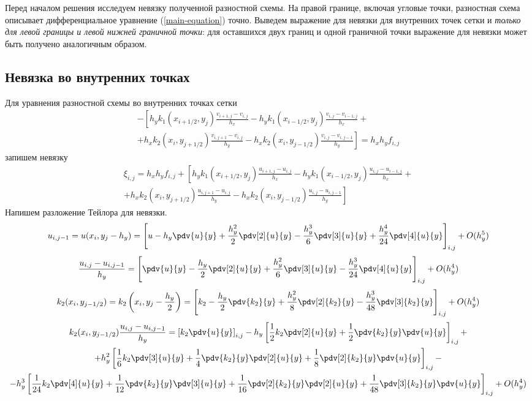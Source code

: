 Перед началом решения исследуем невязку полученной разностной схемы.
На правой границе, включая угловые точки, разностная схема описывает
дифференциальное уравнение (\ref{main-equation}) точно. Выведем выражение
для невязки для внутренних точек сетки и \textit{только для левой границы и левой
нижней граничной точки}: для оставшихся двух границ и одной граничной точки
выражение для невязки может быть получено аналогичным образом.

\subsection{Невязка во внутренних точках}
Для уравнения разностной схемы во внутренних точках сетки
\begin{multline*}
    - \left[
    h_y k_1(x_{i+1/2},y_{j}) \frac{v_{i+1,j} - v_{i,j}}{h_x} - h_y k_1(x_{i-1/2},y_{j}) \frac{v_{i,j} - v_{i-1,j}}{h_x} + \right. \\
    \left. +
    h_x k_2(x_{i},y_{j+1/2}) \frac{v_{i,j+1} - v_{i,j}}{h_y} - h_x k_2(x_{i},y_{j-1/2}) \frac{v_{i,j} - v_{i,j-1}}{h_y}
    \right] =
    h_x h_y f_{i,j}
\end{multline*}
запишем невязку
\begin{multline*}
    \xi_{i,j} = h_x h_y f_{i,j} + \left[
    h_y k_1(x_{i+1/2},y_{j}) \frac{u_{i+1,j} - u_{i,j}}{h_x} - h_y k_1(x_{i-1/2},y_{j}) \frac{u_{i,j} - u_{i-1,j}}{h_x} + \right. \\
    \left. +
    h_x k_2(x_{i},y_{j+1/2}) \frac{u_{i,j+1} - u_{i,j}}{h_y} - h_x k_2(x_{i},y_{j-1/2}) \frac{u_{i,j} - u_{i,j-1}}{h_y}
    \right]
\end{multline*}
Напишем разложение Тейлора для невязки.
\[
    u_{i,j-1} = u(x_{i}, y_{j} - h_y) = \left[ u - h_y \pdv{u}{y} + \frac{h_y^2}{2} \pdv[2]{u}{y} -
    \frac{h_y^3}{6} \pdv[3]{u}{y} + \frac{h_y^4}{24} \pdv[4]{u}{y} \right]_{i,j} + O(h_y^5)
\]
\[
    \frac{u_{i,j} - u_{i,j-1}}{h_y} = \left[ \pdv{u}{y} - \frac{h_y}{2} \pdv[2]{u}{y} +
    \frac{h_y^2}{6} \pdv[3]{u}{y} - \frac{h_y^3}{24} \pdv[4]{u}{y} \right]_{i,j} + O(h_y^4)
\]
\[
    k_2(x_{i},y_{j-1/2}) = k_2 \left( x_{i},y_{j} - \frac{h_y}{2} \right) = \left[
        k_2 - \frac{h_y}{2} \pdv{k_2}{y} + \frac{h_y^2}{8} \pdv[2]{k_2}{y} - \frac{h_y^3}{48} \pdv[3]{k_2}{y}
    \right]_{i,j} + O(h_y^4)
\]
\begin{multline*}
    k_2(x_{i},y_{j-1/2}) \frac{u_{i,j} - u_{i,j-1}}{h_y} = \left[ k_2 \pdv{u}{y} \right]_{i,j} -
    h_y \left[ \frac{1}{2} k_2 \pdv[2]{u}{y} + \frac{1}{2} \pdv{k_2}{y} \pdv{u}{y} \right]_{i,j} + \\
    + h_y^2 \left[ \frac{1}{6} k_2 \pdv[3]{u}{y} + \frac{1}{4} \pdv{k_2}{y} \pdv[2]{u}{y} + \frac{1}{8} \pdv[2]{k_2}{y} \pdv{u}{y} \right]_{i,j} - \\
    - h_y^3 \left[ \frac{1}{24} k_2 \pdv[4]{u}{y} + \frac{1}{12} \pdv{k_2}{y} \pdv[3]{u}{y} + \frac{1}{16} \pdv[2]{k_2}{y} \pdv[2]{u}{y} + \frac{1}{48} \pdv[3]{k_2}{y} \pdv{u}{y} \right]_{i,j} + O(h_y^4)
\end{multline*}


